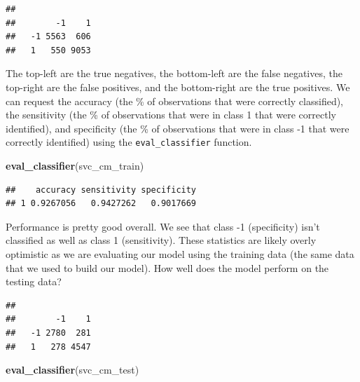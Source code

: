 \documentclass[]{book}
\newenvironment{Shaded}{\begin{snugshade}}{\end{snugshade}}
\newcommand{\DataTypeTok}[1]{\textcolor[rgb]{0.13,0.29,0.53}{#1}}
\newcommand{\KeywordTok}[1]{\textcolor[rgb]{0.13,0.29,0.53}{\textbf{#1}}}
\newcommand{\NormalTok}[1]{#1}
\newcommand{\OperatorTok}[1]{\textcolor[rgb]{0.81,0.36,0.00}{\textbf{#1}}}
\newcommand{\StringTok}[1]{\textcolor[rgb]{0.31,0.60,0.02}{#1}}
\begin{document}
\begin{verbatim}
##     
##        -1    1
##   -1 5563  606
##   1   550 9053
\end{verbatim}

The top-left are the true negatives, the bottom-left are the false negatives, the top-right are the false positives, and the bottom-right are the true positives. We can request the accuracy (the \% of observations that were correctly classified), the sensitivity (the \% of observations that were in class 1 that were correctly identified), and specificity (the \% of observations that were in class -1 that were correctly identified) using the \texttt{eval\_classifier} function.

\begin{Shaded}
\begin{Highlighting}[]
\KeywordTok{eval_classifier}\NormalTok{(svc_cm_train)}
\end{Highlighting}
\end{Shaded}

\begin{verbatim}
##    accuracy sensitivity specificity
## 1 0.9267056   0.9427262   0.9017669
\end{verbatim}

Performance is pretty good overall. We see that class -1 (specificity) isn't classified as well as class 1 (sensitivity). These statistics are likely overly optimistic as we are evaluating our model using the training data (the same data that we used to build our model). How well does the model perform on the testing data?

\begin{Shaded}
\end{Shaded}

\begin{verbatim}
##     
##        -1    1
##   -1 2780  281
##   1   278 4547
\end{verbatim}

\begin{Shaded}
\begin{Highlighting}[]
\KeywordTok{eval_classifier}\NormalTok{(svc_cm_test)}
\end{Highlighting}
\end{Shaded}
\end{document}
